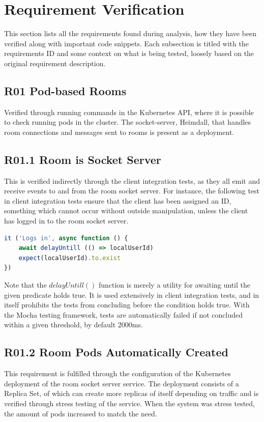 \section{Requirement Verification}

This section lists all the requirements found during analysis, how they have been verified along with important code snippets. Each subsection is titled with the requirements ID and some context on what is being tested, loosely based on the original requirement description.

\subsection{R01 Pod-based Rooms}
\label{vR01}

Verified through running commands in the Kubernetes API, where it is possible to check running pods in the cluster. The socket-server, Heimdall, that handles room connections and messages sent to rooms is present as a deployment.

\subsection{R01.1 Room is Socket Server}
\label{vR01.1}

This is verified indirectly through the client integration tests, as they all emit and receive events to and from the room socket server. For instance, the following test in client integration tests ensure that the client has been assigned an ID, something which cannot occur without outside manipulation, unless the client has logged in to the room socket server.

\begin{lstlisting}[language=JavaScript]
it ('Logs in', async function () {
    await delayUntill (() => localUserId)
    expect(localUserId).to.exist
})
\end{lstlisting}

Note that the $delayUntill()$ function is merely a utility for awaiting until the given predicate holds true. It is used extensively in client integration tests, and in itself prohibits the tests from concluding before the condition holds true. With the Mocha testing framework, tests are automatically failed if not concluded within a given threshold, by default 2000ms.

\subsection{R01.2 Room Pods Automatically Created}
This requirement is fulfilled through the configuration of the Kubernetes deployment of the room socket server service. The deployment consists of a Replica Set, of which can create more replicas of itself depending on traffic and is verified through stress testing of the service. When the system was stress tested, the amount of pods increased to match the need.
\label{vR01.2}

